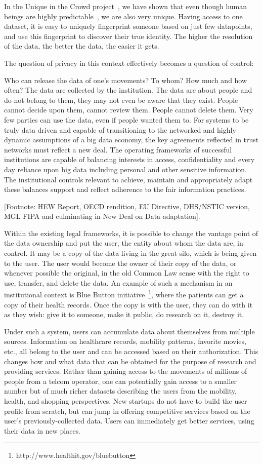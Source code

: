 In the Unique in the Crowd project~\cite{de2013unique}, we have shown that even though human beings are highly predictable~\cite{song2010limits}, we are also very unique.
Having access to one dataset, it is easy to uniquely fingerprint someone based on just few datapoints, and use this fingerprint to discover their true identity.
The higher the resolution of the data, the better the data, the easier it gets.

The question of privacy in this context effectively becomes a question of control:

Who can release the data of one's movements?
To whom?
How much and how often?
The data are collected by the institution.
The data are about people and do not belong to them, they may not even be aware that they exist.
People cannot decide upon them, cannot review them.
People cannot delete them.
Very few parties can use the data, even if people wanted them to.
For systems to be truly data driven and capable of transitioning to the networked and highly dynamic assumptions of a big data economy, the key agreements reflected in trust networks must reflect a new deal.
The operating frameworks of successful institutions are capable of balancing interests in access, confidentiality and every day reliance upon big data including personal and other sensitive information.
The institutional controls relevant to achieve, maintain and appropriately adapt these balances support and reflect adherence to the fair information practices.

[Footnote: HEW Report, OECD rendition, EU Directive, DHS/NSTIC version, MGL FIPA and culminating in New Deal on Data adaptation].

Within the existing legal frameworks, it is possible to change the vantage point of the data ownership and put the user, the entity about whom the data are, in control.
It may be a copy of the data living in the great silo, which is being given to the user.
The user would become the owner of their copy of the data, or whenever possible the original, in the old Common Law sense with the right to use, transfer, and delete the data.
An example of such a mechanism in an institutional context is Blue Button initiative~\footnote{http://www.healthit.gov/bluebutton}, where the patients can get a copy of their health records. 
Once the copy is with the user, they can do with it as they wish: give it to someone, make it public, do research on it, destroy it.

Under such a system, users can accumulate data about themselves from multiple sources.
Information on healthcare records, mobility patterns, favorite movies, etc., all belong to the user and can be accessed based on their authorization.
This changes how and what data that can be obtained for the purpose of research and providing services.
Rather than gaining access to the movements of millions of people from a telcom operator, one can potentially gain access to a smaller number but of much richer datasets describing the users from the mobility, health, and shopping perspectives.
New startups do not have to build the user profile from scratch, but can jump in offering competitive services based on the user's previously-collected data.
Users can immediately get better services, using their data in new places.

